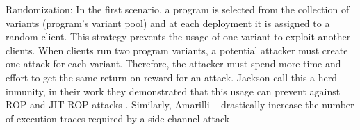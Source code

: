 \begin{usage}{Randomization:}
    \label{usage:randomization}
    \normalfont
    In the first scenario, a program is selected from the collection of variants (program's variant pool) and at each deployment it is assigned to a random client. This strategy prevents the usage of one variant to exploit another clients. When clients run two program variants, a potential attacker must create one attack for each variant. Therefore, the attacker must spend more time and effort to get the same return on reward for an attack. Jackson \etal \cite{jackson} call this a herd inmunity, in their work they demonstrated that this usage can prevent against ROP and JIT-ROP attacks \citationneeded. Similarly, Amarilli \etal~\cite{amarilli2011can} drastically increase the number of execution traces required by a side-channel attack

    
    
\end{usage}

